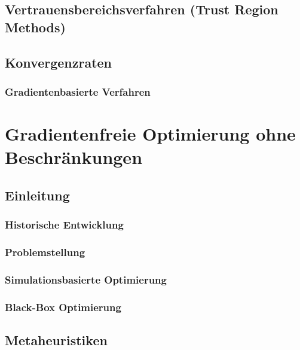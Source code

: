 	\section{Vertrauensbereichsverfahren (Trust Region Methods)} %

	\section{Konvergenzraten} %

		\subsection{Gradientenbasierte Verfahren} %

\chapter{Gradientenfreie Optimierung ohne Beschränkungen} %

	\section{Einleitung} %

		\subsection{Historische Entwicklung} %

		\subsection{Problemstellung} %

		\subsection{Simulationsbasierte Optimierung} %

		\subsection{Black-Box Optimierung} %

	\section{Metaheuristiken} %

